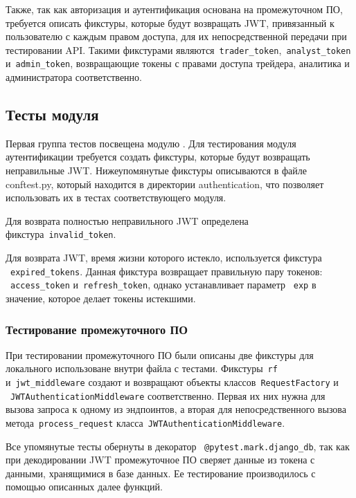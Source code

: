 Также, так как авторизация и аутентификация основана на промежуточном ПО, требуется описать фикстуры,
которые будут возвращать JWT, привязанный к пользователю с каждым правом доступа, для их непосредственной передачи при тестировании API.
Такими фикстурами являются~\lstinline{trader_token},~\lstinline{analyst_token} и~\lstinline{admin_token}, возвращающие токены с правами
доступа трейдера, аналитика и администратора соответственно.


\subsection{Тесты модуля \moduleAuth}\label{subsec:testing:moduleauth}

Первая группа тестов посвещена модулю \moduleAuth.
Для тестирования модуля аутентификации требуется создать фикстуры, которые будут возвращать неправильные JWT.
Нижеупомянутые фикстуры описываются в файле conftest.py, который находится в директории authentication,
что позволяет использовать их в тестах соответствующего модуля.

Для возврата полностью неправильного JWT определена фикстура~\lstinline{invalid_token}.

Для возврата JWT, время жизни которого истекло, используется фикстура ~\lstinline{expired_tokens}.
Данная фикстура возвращает правильную пару токенов:
~\lstinline{access_token} и~\lstinline{refresh_token}, однако устанавливает параметр ~\lstinline{exp} в значение, которое делает токены истекшими.

\subsubsection{Тестирование промежуточного ПО}
При тестировании промежуточного ПО были описаны две фикстуры для локального использоване внутри файла с тестами.
Фикстуры~\lstinline{rf} и~\lstinline{jwt_middleware} создают и возвращают объекты классов~\lstinline{RequestFactory} и ~\lstinline{JWTAuthenticationMiddleware} соответственно.
Первая их них нужна для вызова запроса к одному из эндпоинтов, а вторая для непосредственного вызова метода~\lstinline{process_request} класса~\lstinline{JWTAuthenticationMiddleware}.

Все упомянутые тесты обернуты в декоратор ~\lstinline{@pytest.mark.django_db}, так как при декодировании JWT промежуточное ПО сверяет данные из токена с данными, хранящимися в базе данных.
Ее тестирование производилось с помощью описанных далее функций.

